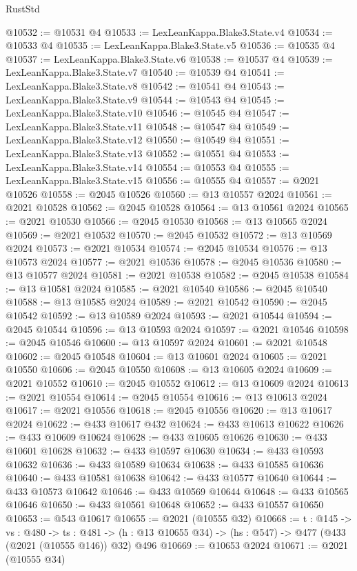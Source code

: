 \begin{lexlean}{RustStd}
\begin{coremodule}
@10532 := @10531 @4
@10533 := LexLeanKappa.Blake3.State.v4
@10534 := @10533 @4
@10535 := LexLeanKappa.Blake3.State.v5
@10536 := @10535 @4
@10537 := LexLeanKappa.Blake3.State.v6
@10538 := @10537 @4
@10539 := LexLeanKappa.Blake3.State.v7
@10540 := @10539 @4
@10541 := LexLeanKappa.Blake3.State.v8
@10542 := @10541 @4
@10543 := LexLeanKappa.Blake3.State.v9
@10544 := @10543 @4
@10545 := LexLeanKappa.Blake3.State.v10
@10546 := @10545 @4
@10547 := LexLeanKappa.Blake3.State.v11
@10548 := @10547 @4
@10549 := LexLeanKappa.Blake3.State.v12
@10550 := @10549 @4
@10551 := LexLeanKappa.Blake3.State.v13
@10552 := @10551 @4
@10553 := LexLeanKappa.Blake3.State.v14
@10554 := @10553 @4
@10555 := LexLeanKappa.Blake3.State.v15
@10556 := @10555 @4
@10557 := @2021 @10526
@10558 := @2045 @10526
@10560 := @13 @10557 @2024
@10561 := @2021 @10528
@10562 := @2045 @10528
@10564 := @13 @10561 @2024
@10565 := @2021 @10530
@10566 := @2045 @10530
@10568 := @13 @10565 @2024
@10569 := @2021 @10532
@10570 := @2045 @10532
@10572 := @13 @10569 @2024
@10573 := @2021 @10534
@10574 := @2045 @10534
@10576 := @13 @10573 @2024
@10577 := @2021 @10536
@10578 := @2045 @10536
@10580 := @13 @10577 @2024
@10581 := @2021 @10538
@10582 := @2045 @10538
@10584 := @13 @10581 @2024
@10585 := @2021 @10540
@10586 := @2045 @10540
@10588 := @13 @10585 @2024
@10589 := @2021 @10542
@10590 := @2045 @10542
@10592 := @13 @10589 @2024
@10593 := @2021 @10544
@10594 := @2045 @10544
@10596 := @13 @10593 @2024
@10597 := @2021 @10546
@10598 := @2045 @10546
@10600 := @13 @10597 @2024
@10601 := @2021 @10548
@10602 := @2045 @10548
@10604 := @13 @10601 @2024
@10605 := @2021 @10550
@10606 := @2045 @10550
@10608 := @13 @10605 @2024
@10609 := @2021 @10552
@10610 := @2045 @10552
@10612 := @13 @10609 @2024
@10613 := @2021 @10554
@10614 := @2045 @10554
@10616 := @13 @10613 @2024
@10617 := @2021 @10556
@10618 := @2045 @10556
@10620 := @13 @10617 @2024
@10622 := @433 @10617 @432
@10624 := @433 @10613 @10622
@10626 := @433 @10609 @10624
@10628 := @433 @10605 @10626
@10630 := @433 @10601 @10628
@10632 := @433 @10597 @10630
@10634 := @433 @10593 @10632
@10636 := @433 @10589 @10634
@10638 := @433 @10585 @10636
@10640 := @433 @10581 @10638
@10642 := @433 @10577 @10640
@10644 := @433 @10573 @10642
@10646 := @433 @10569 @10644
@10648 := @433 @10565 @10646
@10650 := @433 @10561 @10648
@10652 := @433 @10557 @10650
@10653 := @543 @10617
@10655 := @2021 (@10555 @32)
@10668 := {t : @145} ->
  {vs : @480} ->
  {ts : @481} -> (h : @13 @10655 @34) -> (hs : @547) -> @477 (@433 (@2021 (@10555 @146)) @32) @496
@10669 := @10653 @2024
@10671 := @2021 (@10555 @34)

\end{coremodule}
\end{lexlean}

